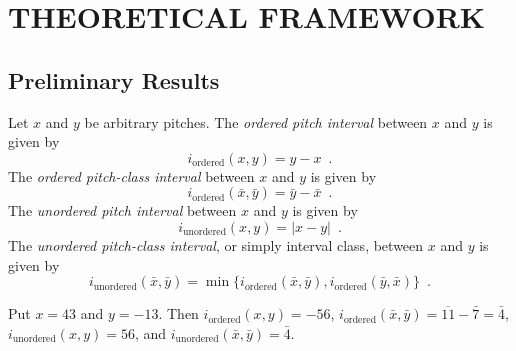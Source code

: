 \chapter{THEORETICAL FRAMEWORK}

\section{Preliminary Results}


\begin{definition}
	Let $x$ and $y$ be arbitrary pitches. The \emph{ordered pitch interval} between
	$x$ and $y$ is given by
	\begin{equation}
		i_\text{ordered}(x, y) = y - x \enspace.
	\end{equation}
	The \emph{ordered pitch-class interval} between $x$ and $y$ is given by
	\begin{equation}
		i_\text{ordered}(\bar{x}, \bar{y}) = \bar{y} - \bar{x} \enspace.
	\end{equation}
	The \emph{unordered pitch interval} between $x$ and $y$ is given by
	\begin{equation}
		i_\text{unordered}(x, y) = |x - y| \enspace.
	\end{equation}
	The \emph{unordered pitch-class interval}, or simply interval class, between
	$x$ and $y$ is given by
	\begin{equation}
		i_\text{unordered}(\bar{x}, \bar{y}) = \min\{i_\text{ordered}(\bar{x}, \bar{y}), 		i_\text{ordered}(\bar{y}, \bar{x})\} \enspace.
	\end{equation}
\end{definition}


\begin{example}
	Put $x = 43$ and $y = -13$. Then $i_\text{ordered}(x, y) = -56$,
	$i_\text{ordered}(\bar{x}, \bar{y}) = \overline{11} - \bar{7} = \bar{4}$,
	$i_\text{unordered}(x, y) = 56$, and $i_\text{unordered}(\bar{x}, \bar{y}) = \bar{4}$.
\end{example}

